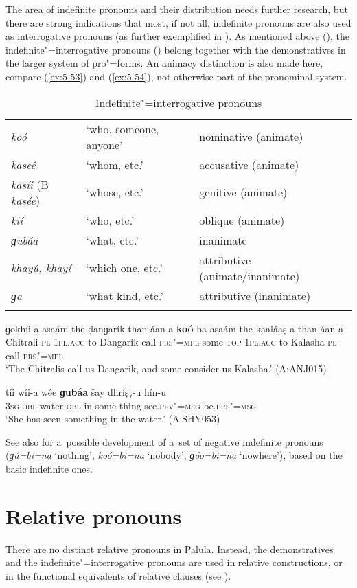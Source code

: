 The area of indefinite pronouns and their distribution needs further research, but there are strong indications that most, if not all, indefinite pronouns are also used as interrogative pronouns (as further exemplified in ). As mentioned above (), the indefinite"=interrogative pronouns () belong together with the demonstratives in the larger system of pro"=forms. An animacy distinction is also made here, compare (\ref{ex:5-53}) and (\ref{ex:5-54}), not otherwise part of the pronominal system.

\begin{table}[H]
\caption{Indefinite"=interrogative pronouns}
\begin{tabularx}{\textwidth}{ l l l }
\lsptoprule
\textit{koó} &
`who, someone, anyone' &
nominative (animate)\\
\textit{kaseé} &
`whom, etc.' &
accusative (animate)\\
\textit{kasíi} (B \textit{kasée}) &
`whose, etc.' &
genitive (animate)\\
\textit{kií} &
`who, etc.' &
oblique (animate)\\
\textit{ɡubáa} &
`what, etc.' &
inanimate \\
\textit{khayú, khayí} &
`which one, etc.' &
attributive (animate/inanimate)\\
\textit{ɡa} &
`what kind, etc.' &
attributive (inanimate)\\\lspbottomrule
\end{tabularx}
\label{tab:5-iipro}
\end{table}
 
\ea
\label{ex:5-53}
\gll ɡokhíi-a asaám the ḍanɡarík than-áan-a \textbf{koó} ba asaám the kaaláaṣ-a than-áan-a\\
Chitrali-\textsc{pl} \textsc{1pl.acc} to Dangarik call-\textsc{prs"=mpl} some \textsc{top} \textsc{1pl.acc} to Kalasha-\textsc{pl} call-\textsc{prs"=mpl}\\
\glt `The Chitralis call us Dangarik, and some consider us Kalasha.' (A:ANJ015)

\ex
\label{ex:5-54}
\gll tíi wíi-a wée \textbf{ɡubáa} šay dhríṣṭ-u hín-u\\
\textsc{3sg.obl} water-\textsc{obl} in some thing see.\textsc{pfv"=msg} be.\textsc{prs"=msg}\\
\glt `She has seen something in the water.' (A:SHY053)
\z

See also  for a~possible development of a~set of negative indefinite pronouns (\textit{ɡá=bi=na} `nothing', \textit{koó=bi=na} `nobody', \textit{ɡóo=bi=na} `nowhere'), based on the basic indefinite ones.

\section{Relative pronouns}
\label{sec:5-8}


There are no distinct relative pronouns in Palula. Instead, the demonstratives and the indefinite"=interrogative pronouns are used in relative constructions, or in the functional equivalents of relative clauses (see ).